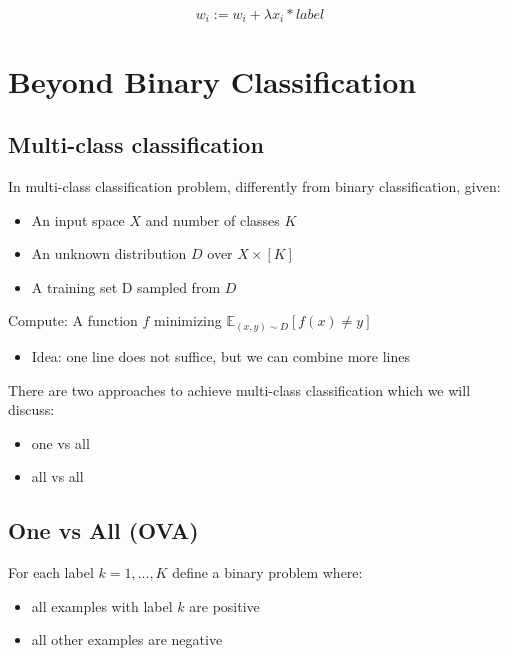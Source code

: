\documentclass{article}
\begin{document}
\[w_i:=w_i+\lambda x_i*label\]

\section{Beyond Binary
Classification}\label{beyond-binary-classification}

\subsection{Multi-class
classification}\label{multi-class-classification}

In multi-class classification problem, differently from binary
classification, given:

\begin{itemize}
\tightlist
\item
  An input space \(X\) and number of classes \(K\)
\item
  An unknown distribution \(D\) over \(X \times [K]\)
\item
  A training set D sampled from \(D\)
\end{itemize}

Compute: A function \(f\) minimizing
\(\mathbb{E}_{(x, y)\sim D}[f(x) \ne  y]\)

\begin{itemize}
\tightlist
\item
  Idea: one line does not suffice, but we can combine more lines
\end{itemize}

There are two approaches to achieve multi-class classification which we
will discuss:

\begin{itemize}
\tightlist
\item
  one vs all
\item
  all vs all
\end{itemize}

\subsection{One vs All (OVA)}\label{one-vs-all-ova}

For each label \(k=1, ..., K\) define a binary problem where:

\begin{itemize}
\tightlist
\item
  all examples with label \(k\) are positive
\item
  all other examples are negative
\end{itemize}
\end{document}
